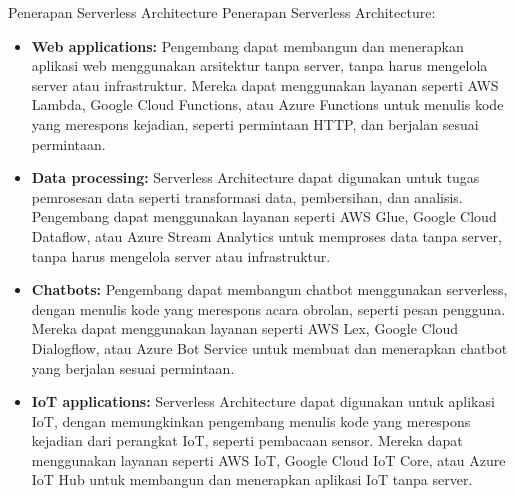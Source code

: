 \documentclass{beamer}
\begin{document}
    \begin{frame}{Penerapan Serverless Architecture}
        Penerapan Serverless Architecture:
        \begin{itemize}
            \item \textbf{Web applications:} Pengembang dapat membangun dan menerapkan aplikasi web menggunakan arsitektur tanpa server, tanpa harus mengelola server atau infrastruktur. Mereka dapat menggunakan layanan seperti AWS Lambda, Google Cloud Functions, atau Azure Functions untuk menulis kode yang merespons kejadian, seperti permintaan HTTP, dan berjalan sesuai permintaan.
		    \item \textbf{Data processing:} Serverless Architecture dapat digunakan untuk tugas pemrosesan data seperti transformasi data, pembersihan, dan analisis. Pengembang dapat menggunakan layanan seperti AWS Glue, Google Cloud Dataflow, atau Azure Stream Analytics untuk memproses data tanpa server, tanpa harus mengelola server atau infrastruktur.
		    \item \textbf{Chatbots:} Pengembang dapat membangun chatbot menggunakan serverless, dengan menulis kode yang merespons acara obrolan, seperti pesan pengguna. Mereka dapat menggunakan layanan seperti AWS Lex, Google Cloud Dialogflow, atau Azure Bot Service untuk membuat dan menerapkan chatbot yang berjalan sesuai permintaan.
		    \item \textbf {IoT applications:} Serverless Architecture dapat digunakan untuk aplikasi IoT, dengan memungkinkan pengembang menulis kode yang merespons kejadian dari perangkat IoT, seperti pembacaan sensor. Mereka dapat menggunakan layanan seperti AWS IoT, Google Cloud IoT Core, atau Azure IoT Hub untuk membangun dan menerapkan aplikasi IoT tanpa server.
        \end{itemize}
    \end{frame}
\end{document}
